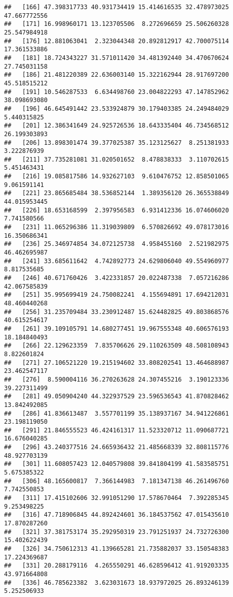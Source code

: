 \documentclass[
]{article}
\begin{document}
\begin{verbatim}
##   [166] 47.398317733 40.931734419 15.414616535 32.478973025 47.667772556
##   [171] 16.998960171 13.123705506  8.272696659 25.506260328 25.547984918
##   [176] 12.881063041  2.323044348 20.892812917 42.700075114 17.361533886
##   [181] 18.724343227 31.571011420 34.481392440 34.470670624 27.745031158
##   [186] 21.481220389 22.636003140 15.322162944 28.917697200 45.518515212
##   [191] 10.546287533  6.634498760 23.004822293 47.147852962 38.098693080
##   [196] 46.645491442 23.533924879 30.179403385 24.249484029  5.440315825
##   [201] 12.386341649 24.925726536 18.643335404 46.734568512 26.199303893
##   [206] 13.898301474 39.377025387 35.123125627  8.251381933  3.222876939
##   [211] 37.735281081 31.020501652  8.478838333  3.110702615  5.451463431
##   [216] 19.085817586 14.932627103  9.610476752 12.858501065  9.061591141
##   [221] 23.865685484 38.536852144  1.389356120 26.365538849 44.015953445
##   [226] 18.653168599  2.397956583  6.931412336 16.074606020  7.741580566
##   [231] 11.065296386 11.319039809  6.570826692 49.078173016 16.350686341
##   [236] 25.346974854 34.072125738  4.958455160  2.521982975 46.462695987
##   [241] 33.685611642  4.742892773 24.629806040 49.554960977  8.817535685
##   [246] 40.671760426  3.422331857 20.022487338  7.057216286 42.067585839
##   [251] 35.995699419 24.750082241  4.155694891 17.694212031 48.460440268
##   [256] 31.235709484 33.230912487 15.624482825 49.803868576 40.615254617
##   [261] 39.109105791 14.680277451 19.967555348 40.606576193 18.184840493
##   [266] 22.129623359  7.835706626 29.110263509 48.508108943  8.822601824
##   [271] 27.106521220 19.215194602 33.808202541 13.464688987 23.462547117
##   [276]  8.590004116 36.270263628 24.307455216  3.190123336 39.227311499
##   [281] 49.050904240 44.322937529 23.596536543 41.870828462 13.842492085
##   [286] 41.836613487  3.557701199 35.138937167 34.941226861 23.198119050
##   [291] 21.846555523 46.424161317 11.523320712 11.090687721 16.676040285
##   [296] 43.240377516 24.665936432 21.485668339 32.808115776 48.927703139
##   [301] 11.608057423 12.040579808 39.841804199 41.583585751  5.675385322
##   [306] 48.165600817  7.366144983  7.181347138 46.261496760  7.742550853
##   [311] 17.415102606 32.991051290 17.578670464  7.392285345  9.253498225
##   [316] 47.718906845 44.892424601 36.184537562 47.015435610 17.870287260
##   [321] 37.381753174 35.292950319 23.791251937 24.732726300 15.402622439
##   [326] 34.750612313 41.139665281 21.735882037 33.150548383 17.224369687
##   [331] 20.288179116  4.265550291 46.628596412 41.919203335 43.971664808
##   [336] 46.785623382  3.623031673 18.937972025 26.893246139  5.252506933

\end{verbatim}
\end{document}
